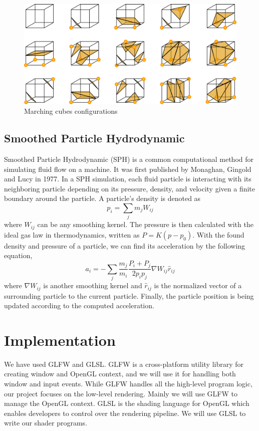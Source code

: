 \documentclass{article}
\begin{document}
\begin{multicols}{2}
			\begin{figure}[H]
				\centering
				\begin{minipage}[b]{0.4\textwidth}
					\includegraphics[width=\textwidth]{img/marching-cubes-config.png}
                    \caption{Marching cubes configurations \cite{wiki10}}
					\label{fig:marching-cubes-config}
				\end{minipage}
			\end{figure}
		
		\subsection{Smoothed Particle Hydrodynamic}
			Smoothed Particle Hydrodynamic (SPH) is a common computational method for simulating fluid flow on a machine. It was first published by Monaghan, Gingold and Lucy in 1977. In a SPH simulation, each fluid particle is interacting with its neighboring particle depending on its pressure, density, and velocity given a finite boundary around the particle. A particle's density is denoted as $$p_i=\sum_{j} m_jW_{ij}$$ where $W_{ij}$ can be any smoothing kernel. The pressure is then calculated with the ideal gas law in thermodynamics, written as $P=K(p-p_0)$. With the found density and pressure of a particle, we can find its acceleration by the following equation, $$a_i=-\sum_{j} \frac{m_j}{m_i}\frac{P_i+P_j}{2p_ip_j}\nabla W_{ij}\hat{r}_{ij}$$ where $\nabla W_{ij}$ is another smoothing kernel and $\hat{r}_{ij}$ is the normalized vector of a surrounding particle to the current particle. Finally, the particle position is being updated according to the computed acceleration. 

    \section{Implementation}

        We have used GLFW and GLSL. GLFW is a cross-platform utility library for creating window and OpenGL context, and we will use it for handling both window and input events. While GLFW handles all the high-level program logic, our project focuses on the low-level rendering. Mainly we will use GLFW to manage the OpenGL context. GLSL is the shading language for OpenGL which enables developers to control over the rendering pipeline. We will use GLSL to write our shader programs.
        

\end{multicols}
\end{document}
